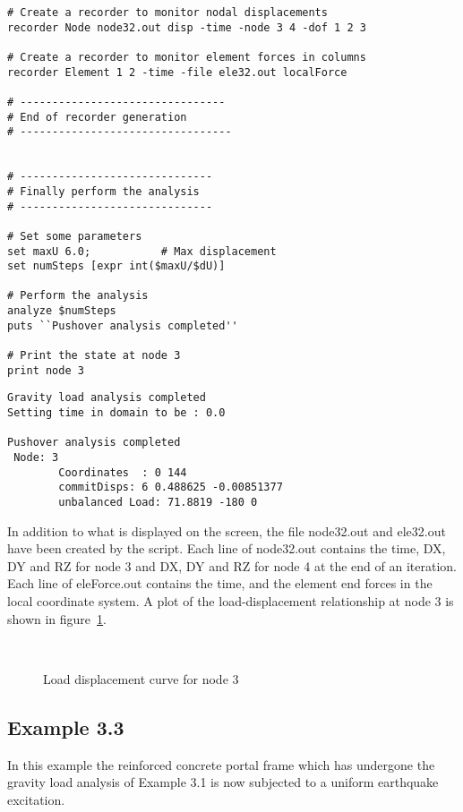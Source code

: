 \documentclass[12pt]{article}
\begin{document}
{\begin{verbatim}
# Create a recorder to monitor nodal displacements
recorder Node node32.out disp -time -node 3 4 -dof 1 2 3

# Create a recorder to monitor element forces in columns
recorder Element 1 2 -time -file ele32.out localForce

# --------------------------------
# End of recorder generation
# ---------------------------------


# ------------------------------
# Finally perform the analysis
# ------------------------------

# Set some parameters
set maxU 6.0;	        # Max displacement
set numSteps [expr int($maxU/$dU)]

# Perform the analysis
analyze $numSteps
puts ``Pushover analysis completed''

# Print the state at node 3
print node 3
\end{verbatim}
}


\pagebreak
{}

{\sf\small
\begin{verbatim}
Gravity load analysis completed
Setting time in domain to be : 0.0

Pushover analysis completed
 Node: 3
        Coordinates  : 0 144 
        commitDisps: 6 0.488625 -0.00851377 
        unbalanced Load: 71.8819 -180 0 
\end{verbatim}
}

In addition to what is displayed on the screen, the file
node32.out and ele32.out have been 
created by the script. Each line of node32.out contains the time,
DX, DY and RZ for node 3 and DX, DY and RZ for node 4 at the end of an
iteration. Each line of eleForce.out contains the time,
and the element end forces in the local coordinate system.
A plot of  the load-displacement relationship at node 3 is shown in
figure~\ref{lateral32}.


\begin{figure}[htpb]
\begin{center}
\leavevmode
\hbox{%
\epsfxsize=4.0in
}
\end{center}
\caption{Load displacement curve for node 3}
\label{lateral32}
\end{figure}

\pagebreak
\subsection{Example 3.3}
In this example the reinforced concrete portal frame which
has undergone the gravity load analysis of Example 3.1 is now
subjected to a uniform earthquake excitation.
\end{document}
